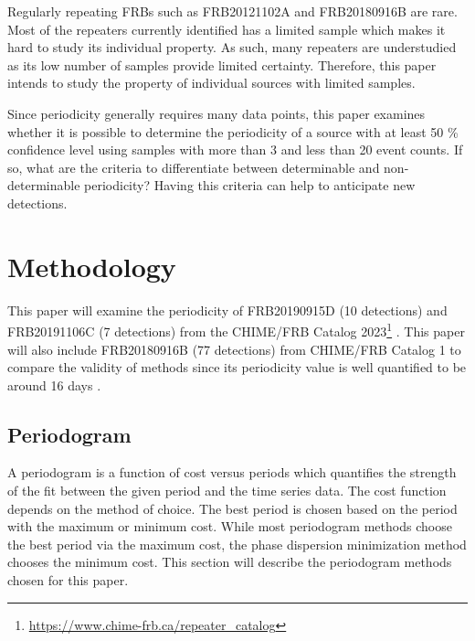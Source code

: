 \documentclass[reprint,amsmath,amssymb,showkeys,prd]{revtex4-2}
\begin{document}
Regularly repeating FRBs such as FRB20121102A and FRB20180916B are rare.
Most of the repeaters currently identified has a limited sample which makes it hard to study its individual property.
As such, many repeaters are understudied as its low number of samples provide limited certainty.
Therefore, this paper intends to study the property of individual sources with limited samples.

Since periodicity generally requires many data points, this paper examines whether it is possible to determine the periodicity of a source with at least 50 \% confidence level using samples with more than 3 and less than 20 event counts.
If so, what are the criteria to differentiate between determinable and non-determinable periodicity?
Having this criteria can help to anticipate new detections.

\section{Methodology}

This paper will examine the periodicity of FRB20190915D (10 detections) and FRB20191106C (7 detections) from the CHIME/FRB Catalog 2023\footnote{\url{https://www.chime-frb.ca/repeater_catalog}}  \cite{andersen_CHIMEFRBDiscovery_2023}.
This paper will also include FRB20180916B (77 detections) from CHIME/FRB Catalog 1\footnotemark[1]\cite{thechimefrbcollaborationFirstCHIMEFRB2021}  to compare the validity of methods since its periodicity value is well quantified to be around 16 days \cite{thechimefrbcollaborationPeriodicActivityFast2020, sand_CHIMEFRBStudy_2023}.

\subsection{Periodogram}


A periodogram is a function of cost versus periods which quantifies the strength of the fit between the given period and the time series data.
The cost function depends on the method of choice.
The best period is chosen based on the period with the maximum or minimum cost.
While most periodogram methods choose the best period via the maximum cost, the phase dispersion minimization method chooses the minimum cost.
This section will describe the periodogram methods chosen for this paper.
\end{document}
